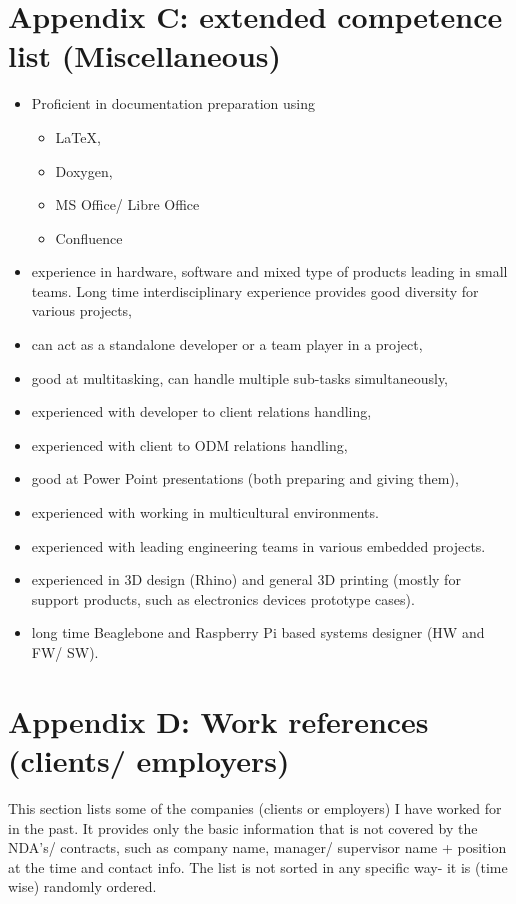 \documentclass{tccv}
\begin{document}
\clearpage

\section{Appendix C: extended competence list (Miscellaneous)}

\begin{itemize}
	\item Proficient in documentation preparation using 
	\begin{itemize}
		\item \LaTeX, 
		\item Doxygen,
		\item MS Office/ Libre Office
		\item Confluence
	\end{itemize}
	\item experience in hardware, software and mixed type of products leading in small teams. Long time interdisciplinary experience provides good diversity for various projects,
	\item can act as a standalone developer or a team player in a project,
	\item good at multitasking, can handle multiple sub-tasks simultaneously,
	\item experienced with developer to client relations handling,
	\item experienced with client to ODM relations handling,
	\item good at Power Point presentations (both preparing and giving them),
	\item experienced with working in multicultural environments.
	\item experienced with leading engineering teams in various embedded projects.
	\item experienced in 3D design (Rhino) and general 3D printing (mostly for support products, such as electronics devices prototype cases).
	\item long time Beaglebone and Raspberry Pi based systems designer (HW and FW/ SW).
	 
\end{itemize}

\clearpage

\section{Appendix D: Work references (clients/ employers)}
\label{sec:clients}

This section lists some of the companies (clients or employers) I have worked for in the past. It provides only the basic information that is not covered by the NDA's/ contracts, such as company name, manager/ supervisor name + position at the time and contact info. The list is not sorted in any specific way- it is (time wise) randomly ordered. \\
\end{document}
